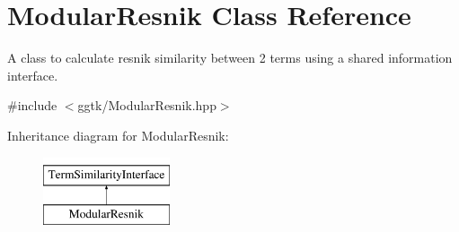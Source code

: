 \hypertarget{classModularResnik}{}\section{Modular\+Resnik Class Reference}
\label{classModularResnik}


A class to calculate resnik similarity between 2 terms using a shared information interface.  




{\ttfamily \#include $<$ggtk/\+Modular\+Resnik.\+hpp$>$}

Inheritance diagram for Modular\+Resnik\+:\begin{figure}[H]
\begin{center}
\leavevmode
\includegraphics[height=2.000000cm]{classModularResnik}
\end{center}
\end{figure}
